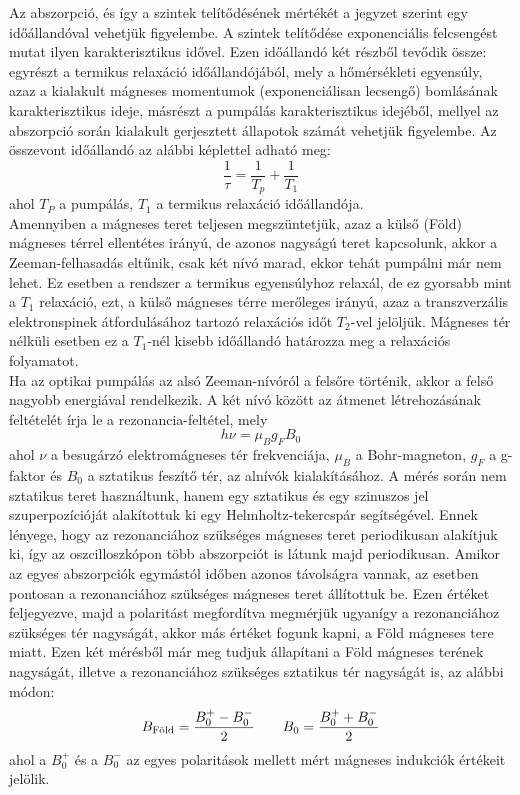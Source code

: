 \documentclass[12pt,a4paper]{article}
\begin{document}
\hspace*{10pt} Az abszorpció, és így a szintek telítődésének mértékét a \cite{1} jegyzet szerint egy időállandóval vehetjük figyelembe. A szintek telítődése exponenciális felcsengést mutat ilyen karakterisztikus idővel. Ezen időállandó két részből tevődik össze: egyrészt a termikus relaxáció időállandójából, mely a hőmérsékleti egyensúly, azaz a kialakult mágneses momentumok (exponenciálisan lecsengő) bomlásának karakterisztikus ideje, másrészt a pumpálás karakterisztikus idejéből, mellyel az abszorpció során kialakult gerjesztett állapotok számát vehetjük figyelembe. Az összevont időállandó az alábbi képlettel adható meg:
\begin{equation}
\frac{1}{\tau}=\frac{1}{T_{p}}+\frac{1}{T_{1}}
\end{equation}
ahol $T_{P}$ a pumpálás, $T_1$ a termikus relaxáció időállandója.\\
\hspace*{10pt} Amennyiben a mágneses teret teljesen megszüntetjük, azaz a külső (Föld) mágneses térrel ellentétes irányú, de azonos nagyságú teret kapcsolunk, akkor a Zeeman-felhasadás eltűnik, csak két nívó marad, ekkor tehát pumpálni már nem lehet. Ez esetben a rendszer a termikus egyensúlyhoz relaxál, de ez gyorsabb mint a $T_1$ relaxáció, ezt, a külső mágneses térre merőleges irányú, azaz a transzverzális elektronspinek átfordulásához tartozó relaxációs időt $T_2$-vel jelöljük. Mágneses tér nélküli esetben ez a $T_1$-nél kisebb időállandó határozza meg a relaxációs folyamatot.\\
\hspace*{10pt} Ha az optikai pumpálás az alsó Zeeman-nívóról a felsőre történik, akkor a felső nagyobb energiával rendelkezik. A két nívó között az átmenet létrehozásának feltételét írja le a rezonancia-feltétel, mely 
$$h\nu = \mu_{B} g_{F} B_0$$
ahol $\nu$ a besugárzó elektromágneses tér frekvenciája, $\mu_{B}$ a Bohr-magneton, $g_{F}$ a g-faktor és $B_0$ a sztatikus feszítő tér, az alnívók kialakításához. A mérés során nem sztatikus teret használtunk, hanem egy sztatikus és egy szinuszos jel szuperpozícióját alakítottuk ki egy Helmholtz-tekercspár segítségével. Ennek lényege, hogy az rezonanciához szükséges mágneses teret periodikusan alakítjuk ki, így az oszcilloszkópon több abszorpciót is látunk majd periodikusan. Amikor az egyes abszorpciók egymástól időben azonos távolságra vannak, az esetben pontosan a rezonanciához szükséges mágneses teret állítottuk be. Ezen értéket feljegyezve, majd a polaritást megfordítva megmérjük ugyanígy a rezonanciához szükséges tér nagyságát, akkor más értéket fogunk kapni, a Föld mágneses tere miatt. Ezen két mérésből már meg tudjuk állapítani a Föld mágneses terének nagyságát, illetve a rezonanciához szükséges sztatikus tér nagyságát is, az alábbi módon:
$$B_{\textrm{Föld}}=\frac{B_0^{+}-B_0^{-}}{2} \hspace*{20pt} B_0=\frac{B_0^{+}+B_0^{-}}{2}$$
ahol a $B_0^{+}$ és a $B_0^{-}$ az egyes polaritások mellett mért mágneses indukciók értékeit jelölik.
\newpage
\end{document}
